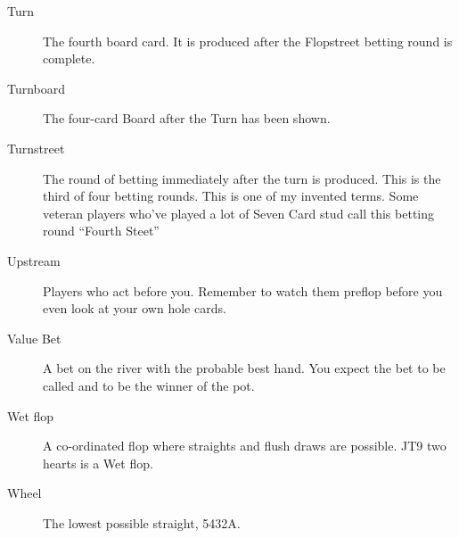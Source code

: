 \begin{description}
\item[Turn] The fourth board card. It is produced after the Flopstreet
betting round is complete.

\item[Turnboard] The four-card Board after the Turn has been shown.

\item[Turnstreet] The round of betting immediately after the turn is
produced. This is the third of four betting rounds. This is one
of my invented terms. Some veteran players who've played a lot of
Seven Card stud call this betting round ``Fourth Steet''

\item[Upstream] Players who act before you. Remember to watch them
preflop before you even look at your own hole cards.

\item[Value Bet] A bet on the river with the probable best hand. You
expect the bet to be called and to be the winner of the pot.

\item[Wet flop] A co-ordinated flop where straights and flush draws
are possible. JT9 two hearts is a Wet flop.

\item[Wheel] The lowest possible straight, 5432A.

\end{description}
